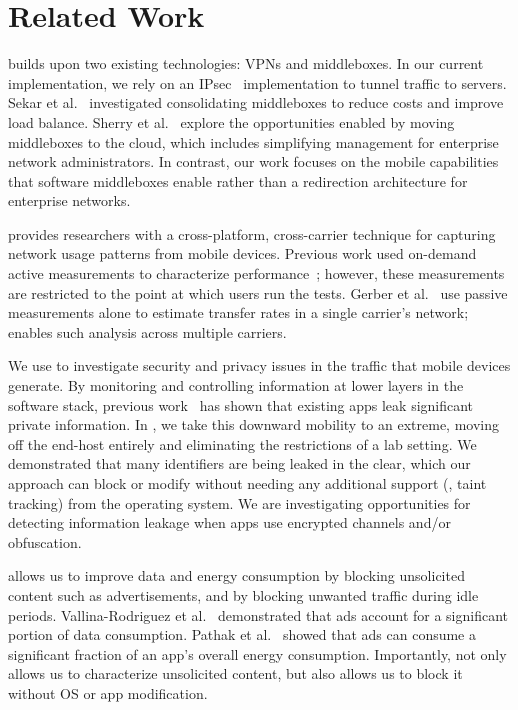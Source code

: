 \section{Related Work}
\label{sec:rw}
\meddle builds upon two existing technologies: VPNs and middleboxes. 
In our current implementation, we rely on an IPsec~\cite{rfc:ipsec} implementation 
to tunnel traffic to \meddle servers. Sekar et al.~\cite{sekar:middleboxes} investigated consolidating middleboxes 
to reduce costs and improve load balance. Sherry et al.~\cite{sherry:middleboxes} explore the opportunities 
enabled by moving middleboxes to the cloud, which includes simplifying management 
for enterprise network administrators. In contrast, our work focuses on the mobile capabilities 
that software middleboxes enable rather than a redirection architecture for enterprise networks. 

\meddle provides researchers with a cross-platform, cross-carrier technique 
for capturing network usage patterns from mobile devices. Previous work 
used on-demand active measurements to characterize performance~\cite{wang:middleboxes,speedtest}; 
however, these measurements are restricted to the point at which users run 
the tests. Gerber et al.~\cite{gerber:passivespeed} use passive measurements alone 
to estimate transfer rates in a single carrier's network; \meddle 
enables such analysis across multiple carriers.

We use \meddle to investigate security and privacy issues in the 
traffic that mobile devices generate. By monitoring and controlling 
information at lower layers in the software stack, previous work~\cite{enck:taintdroid,hornyack:appfence,wsj:apps-watching-you} has shown 
that existing apps leak significant private information. In \meddle, we take 
this downward mobility to an extreme, moving off the end-host entirely and 
eliminating the restrictions of a lab setting. We demonstrated that  
many identifiers are being leaked in the clear, which our approach can 
block or modify without needing any additional support (\eg, taint tracking) 
from the operating system. We are investigating 
opportunities for detecting information leakage when apps use encrypted 
channels and/or obfuscation.

\meddle allows us to improve data and energy consumption by blocking 
unsolicited content such as advertisements, and by blocking unwanted 
traffic during idle periods. Vallina-Rodriguez et al.~\cite{vallina-rod:ads} demonstrated 
that ads account for a significant portion of data consumption. Pathak et al.~\cite{pathak:eprof} 
showed that ads can consume a significant fraction of an app's overall energy consumption. 
Importantly, \meddle not only allows us to characterize unsolicited content, but 
also allows us to block it without OS or app modification.

